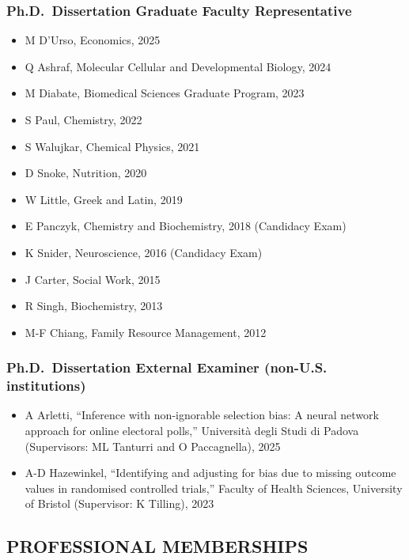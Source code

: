 \documentclass[
  english,
  letterpaper,
  DIV=11,
  numbers=noendperiod]{scrartcl}
\providecommand{\tightlist}{%
  \setlength{\itemsep}{0pt}\setlength{\parskip}{0pt}}
\begin{document}
\subsubsection{Ph.D.~Dissertation Graduate Faculty
Representative}\label{ph.d.-dissertation-graduate-faculty-representative}

\begin{itemize}
\tightlist
\item
  M D'Urso, Economics, 2025
\item
  Q Ashraf, Molecular Cellular and Developmental Biology, 2024
\item
  M Diabate, Biomedical Sciences Graduate Program, 2023
\item
  S Paul, Chemistry, 2022
\item
  S Walujkar, Chemical Physics, 2021
\item
  D Snoke, Nutrition, 2020
\item
  W Little, Greek and Latin, 2019
\item
  E Panczyk, Chemistry and Biochemistry, 2018 (Candidacy Exam)
\item
  K Snider, Neuroscience, 2016 (Candidacy Exam)
\item
  J Carter, Social Work, 2015
\item
  R Singh, Biochemistry, 2013
\item
  M-F Chiang, Family Resource Management, 2012
\end{itemize}

\subsubsection{Ph.D.~Dissertation External Examiner (non-U.S.
institutions)}\label{ph.d.-dissertation-external-examiner-non-u.s.-institutions}

\begin{itemize}
\tightlist
\item
  A Arletti, ``Inference with non-ignorable selection bias: A neural
  network approach for online electoral polls,'' Università degli Studi
  di Padova (Supervisors: ML Tanturri and O Paccagnella), 2025
\item
  A-D Hazewinkel, ``Identifying and adjusting for bias due to missing
  outcome values in randomised controlled trials,'' Faculty of Health
  Sciences, University of Bristol (Supervisor: K Tilling), 2023
\end{itemize}

\subsection{PROFESSIONAL MEMBERSHIPS}\label{professional-memberships}
\end{document}
